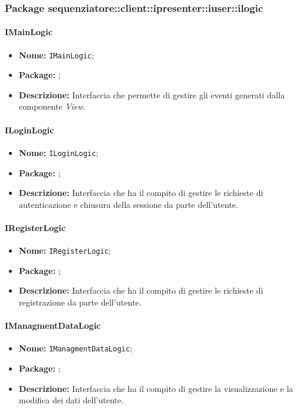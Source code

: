 \subsubsection{Package sequenziatore::client::ipresenter::iuser::ilogic}

\paragraph{IMainLogic}
\begin{itemize}
\item \textbf{Nome:} \texttt{IMainLogic};
\item \textbf{Package:} \texttt{\iLogicUser{}};
\item \textbf{Descrizione:} Interfaccia che permette di gestire gli eventi generati dalla componente \textit{View}.
\end{itemize}

\paragraph{ILoginLogic}
\begin{itemize}
\item \textbf{Nome:} \texttt{ILoginLogic};
\item \textbf{Package:} \texttt{\iLogicUser{}};
\item \textbf{Descrizione:} Interfaccia che ha il compito di gestire le richieste di autenticazione e chiusura della sessione da parte dell'utente.
\end{itemize}

\paragraph{IRegisterLogic}
\begin{itemize}
\item \textbf{Nome:} \texttt{IRegisterLogic};
\item \textbf{Package:} \texttt{\iLogicUser{}};
\item \textbf{Descrizione:} Interfaccia che ha il compito di gestire le richieste di registrazione da parte dell'utente.
\end{itemize}

\paragraph{IManagmentDataLogic}
\begin{itemize}
\item \textbf{Nome:} \texttt{IManagmentDataLogic};
\item \textbf{Package:} \texttt{\iLogicUser{}};
\item \textbf{Descrizione:} Interfaccia che ha il compito di gestire la visualizzazione e la modifica dei dati dell'utente.
\end{itemize}


